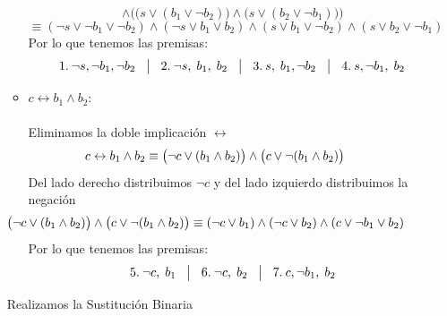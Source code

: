 \documentclass[12pt,letterpaper]{article}
\begin{document}
\begin{enumerate}
\begin{itemize}[label=\textbullet]
\[    \land
    \Big(\big(s \lor (b_1 \lor \neg b_2)\big) \land \big(s \lor (b_2 \lor \neg b_1)\big)\Big)
    \]
    \[
    \equiv
    (\neg s\lor \neg b_1 \lor \neg b_2) \land (\neg s \lor b_1 \lor b_2)
    \land
    (s \lor b_1 \lor \neg b_2) \land (s \lor b_2 \lor \neg b_1)
    \]
    Por lo que tenemos las premisas:
    \[
    1.\: \neg s, \neg b_{1}, \neg b_{2}
    \hspace{3mm} \big | \hspace{3mm}
    2.\: \neg s,\; b_{1},\; b_{2}
    \hspace{3mm} \big | \hspace{3mm}
    3.\: s,\; b_{1}, \neg b_{2}
    \hspace{3mm} \big | \hspace{3mm}
    4.\: s, \neg b_{1},\; b_{2}
    \]

  \item $c \leftrightarrow b_1 \land b_2$:\\
    \\
    Eliminamos la doble implicaci\'{o}n $\leftrightarrow$
    \[
    \hspace{-1cm}
    c \leftrightarrow b_1 \land b_2
    \equiv
    \big(\neg c \lor (b_1 \land b_2)\big) \land \big(c \lor \neg(b_1 \land b_2)\big)
    \]
    Del lado derecho distribuimos $\neg c$ y del lado izquierdo distribuimos la negaci\'{o}n
    \[
    \hspace{-1.5cm}
    \big(\neg c \lor (b_1 \land b_2)\big) \land \big(c \lor \neg(b_1 \land b_2)\big)
    \equiv
    (\neg c \lor b_1) \land (\neg c \lor b_2) \land (c \lor \neg b_1 \lor b_2)
    \]
    Por lo que tenemos las premisas:
    \[
    5.\: \neg c,\; b_1
    \hspace{3mm} \big | \hspace{3mm}
    6.\: \neg c,\; b_2
    \hspace{3mm} \big | \hspace{3mm}
    7.\: c, \neg b_{1}, \; b_2
    \]
    
  \end{itemize}

  Realizamos la Sustituci\'{o}n Binaria
  

\end{enumerate}
\end{document}
